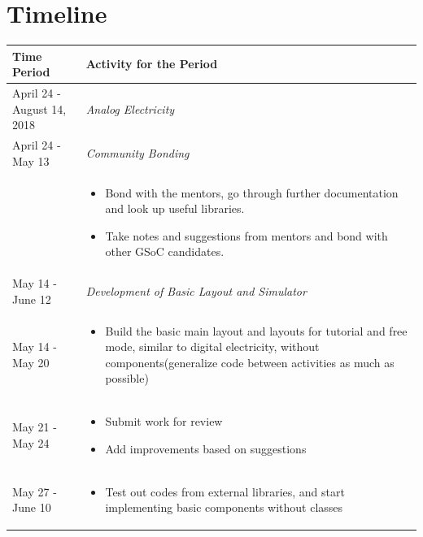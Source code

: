 \documentclass[preprint,12pt]{elsarticle}
\begin{document}
\section{Timeline}
\label{S:1}

\begin{center}
\setlength{\extrarowheight}{1.75pt}
\begin{tabularx}{\linewidth}{|l|X|}
\hline

\textbf{Time Period} & \textbf{Activity for the Period}\\
\hline

{April 24 - August 14, 2018} & {\textit{Analog Electricity}}\\
\hline

{April 24 - May 13} & {\textit{Community Bonding}}\\
\hline

 & \par
\parbox{12cm}{
\begin{itemize}[noitemsep, topsep=2pt]
	\item Bond with the mentors, go through further documentation and look up useful libraries.
	\item Take notes and suggestions from mentors and bond with other GSoC candidates.
\end{itemize}
}\\
\hline\hline

{May 14 - June 12} & {\textit{Development of Basic Layout and Simulator}}\\
\hline

{May 14 - May 20} & \par
\parbox{12cm}{
\begin{itemize}[noitemsep, topsep=2pt]
	\item Build the basic main layout and layouts for tutorial and free mode, similar to digital electricity, without components(generalize code between activities as much as possible)
\end{itemize}
}\\
\hline

{May 21 - May 24} & \par
\parbox{12cm}{
\begin{itemize}[noitemsep, topsep=2pt]
	\item Submit work for review
	\item Add improvements based on suggestions
\end{itemize}
}\\
\hline

{May 27 - June 10} & \par
\parbox{12cm}{
\begin{itemize}[noitemsep, topsep=2pt]
	\item Test out codes from external libraries, and start implementing basic components without classes


\end{itemize}}
\end{tabularx}
\end{center}
\end{document}
